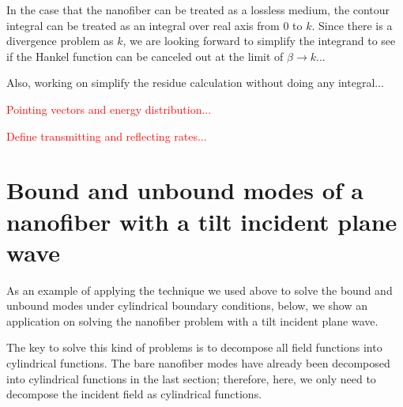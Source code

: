 \documentclass[]{report}
\begin{document}
In the case that the nanofiber can be treated as a lossless medium, the contour integral can be treated as an integral over real axis from $ 0 $ to $ k $. Since there is a divergence problem as $ k $, we are looking forward to simplify the integrand to see if the Hankel function can be canceled out at the limit of $ \beta \rightarrow k $...

Also, working on simplify the residue calculation without doing any integral...






\textcolor{red}{Pointing vectors and energy distribution...}

\textcolor{red}{Define transmitting and reflecting rates...}


\section{Bound and unbound modes of a nanofiber with a tilt incident plane wave}
As an example of applying the technique we used above to solve the bound and unbound modes under cylindrical boundary conditions, below, we show an application on solving the nanofiber problem with a tilt incident plane wave. 

The key to solve this kind of problems is to decompose all field functions into cylindrical functions. The bare nanofiber modes have already been decomposed into cylindrical functions in the last section; therefore, here, we only need to decompose the incident field as cylindrical functions. 
\end{document}
